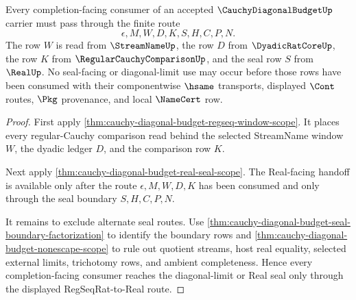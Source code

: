 \begin{theorem}
\label{thm:cauchy-diagonal-budget-regseq-real-route-lock}
Every completion-facing consumer of an accepted $\CauchyDiagonalBudgetUp$ carrier must pass through the finite route
$$
\epsilon,M,W,D,K,S,H,C,P,N.
$$
The row $W$ is read from $\StreamNameUp$, the row $D$ from $\DyadicRatCoreUp$, the row $K$ from $\RegularCauchyComparisonUp$, and the seal row $S$ from $\RealUp$. No seal-facing or diagonal-limit use may occur before those rows have been consumed with their componentwise $\hsame$ transports, displayed $\Cont$ routes, $\Pkg$ provenance, and local $\NameCert$ row.
\end{theorem}
\begin{proof}
First apply \autoref{thm:cauchy-diagonal-budget-regseq-window-scope}. It places every regular-Cauchy comparison read behind the selected StreamName window $W$, the dyadic ledger $D$, and the comparison row $K$.

Next apply \autoref{thm:cauchy-diagonal-budget-real-seal-scope}. The Real-facing handoff is available only after the route $\epsilon,M,W,D,K$ has been consumed and only through the seal boundary $S,H,C,P,N$.

It remains to exclude alternate seal routes. Use \autoref{thm:cauchy-diagonal-budget-seal-boundary-factorization} to identify the boundary rows and \autoref{thm:cauchy-diagonal-budget-nonescape-scope} to rule out quotient streams, host real equality, selected external limits, trichotomy rows, and ambient completeness. Hence every completion-facing consumer reaches the diagonal-limit or Real seal only through the displayed RegSeqRat-to-Real route.
\end{proof}

